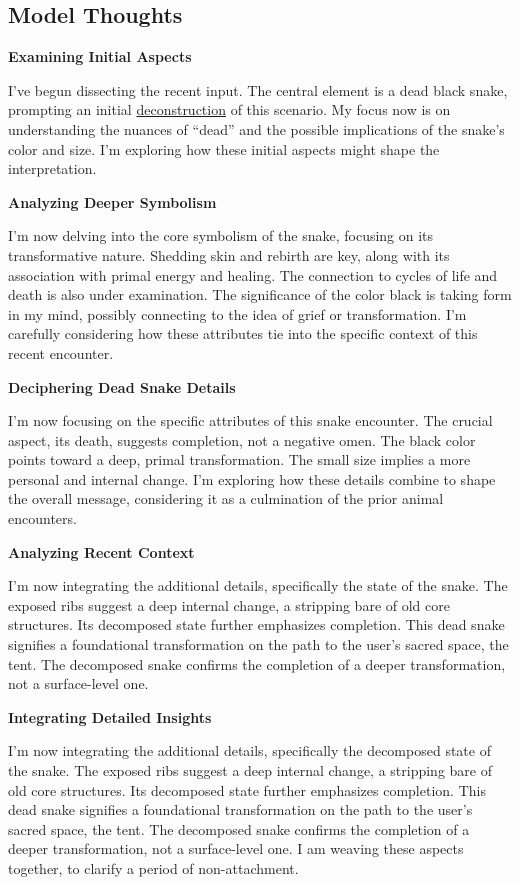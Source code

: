 \documentclass{article}
\begin{document}
\subsection*{Model Thoughts}\label{model-thoughts}

\textbf{Examining Initial Aspects}

I've begun dissecting the recent input. The central element is a dead black snake, prompting an initial \hyperlink{gloss:deconstruction}{deconstruction} of this scenario. My focus now is on understanding the nuances of ``dead'' and the possible implications of the snake's color and size. I'm exploring how these initial aspects might shape the interpretation.

\textbf{Analyzing Deeper Symbolism}

I'm now delving into the core symbolism of the snake, focusing on its transformative nature. Shedding skin and rebirth are key, along with its association with primal energy and healing. The connection to cycles of life and death is also under examination. The significance of the color black is taking form in my mind, possibly connecting to the idea of grief or transformation. I'm carefully considering how these attributes tie into the specific context of this recent encounter.

\textbf{Deciphering Dead Snake Details}

I'm now focusing on the specific attributes of this snake encounter. The crucial aspect, its death, suggests completion, not a negative omen. The black color points toward a deep, primal transformation. The small size implies a more personal and internal change. I'm exploring how these details combine to shape the overall message, considering it as a culmination of the prior animal encounters.

\textbf{Analyzing Recent Context}

I'm now integrating the additional details, specifically the state of the snake. The exposed ribs suggest a deep internal change, a stripping bare of old core structures. Its decomposed state further emphasizes completion. This dead snake signifies a foundational transformation on the path to the user's sacred space, the tent. The decomposed snake confirms the completion of a deeper transformation, not a surface-level one.

\textbf{Integrating Detailed Insights}

I'm now integrating the additional details, specifically the decomposed state of the snake. The exposed ribs suggest a deep internal change, a stripping bare of old core structures. Its decomposed state further emphasizes completion. This dead snake signifies a foundational transformation on the path to the user's sacred space, the tent. The decomposed snake confirms the completion of a deeper transformation, not a surface-level one. I am weaving these aspects together, to clarify a period of non-attachment.
\end{document}
